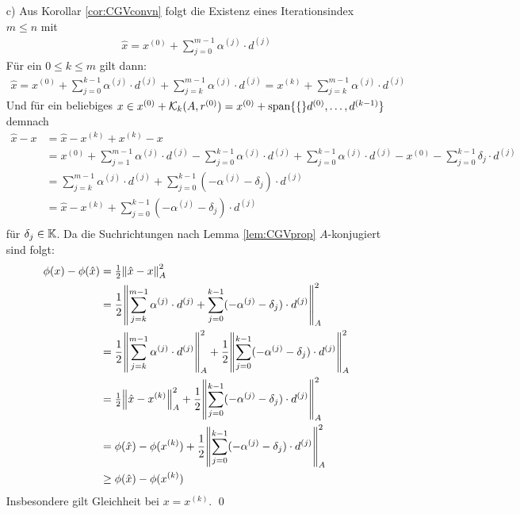 \begin{enumerate}
  \item[c)] 
  Aus Korollar \ref{cor:CGVconvn} folgt die Existenz eines Iterationsindex $m\leq n$ mit 
  \begin{align*}
    \hat{x} 
    = x^{(0)} + \sum_{j=0}^{m-1} \alpha^{(j)}\cdot d^{(j)}
  \end{align*}
  Für ein $0\leq k\leq m$ gilt dann:
  \begin{align*}
    \hat{x}
    = x^{(0)} + \sum_{j=0}^{k-1} \alpha^{(j)}\cdot d^{(j)} + \sum_{j=k}^{m-1} \alpha^{(j)}\cdot d^{(j)} 
    = x^{(k)} + \sum_{j=k}^{m-1} \alpha^{(j)}\cdot d^{(j)}
  \end{align*}
  Und für ein beliebiges $x\in x^{(0)} + \mathcal{K}_k(A,r^{(0)}) = x^{(0)} + \text{span}\{\{\}d^{(0)},\dots,d^{(k-1)}\}$ 
  demnach
  \begin{align*}
    \hat{x}-x 
    & = \hat{x}-x^{(k)}+x^{(k)}-x \\
    & = x^{(0)} + \sum_{j=1}^{m-1}\alpha^{(j)}\cdot d^{(j)} 
    - \sum_{j=0}^{k-1} \alpha^{(j)}\cdot d^{(j)} 
    + \sum_{j=0}^{k-1} \alpha^{(j)}\cdot d^{(j)} 
    - x^{(0)} - \sum_{j=0}^{k-1}\delta_j\cdot d^{(j)}\\
    & = \sum_{j=k}^{m-1}\alpha^{(j)}\cdot d^{(j)} + \sum_{j=0}^{k-1}(-\alpha^{(j)}-\delta_j)\cdot d^{(j)} \\
    & = \hat{x} - x^{(k)} + \sum_{j=0}^{k-1}(-\alpha^{(j)}-\delta_j)\cdot d^{(j)} \\
  \end{align*}
  für $\delta_j\in\mathbb K$. Da die Suchrichtungen nach Lemma \ref{lem:CGVprop} $A$-konjugiert sind folgt:
  \begin{align*}
    \phi(x) - \phi(\hat{x})
    &= \tfrac{1}{2}\vertn{2}{\hat{x}-x}_A^2 \\
    &= \dfrac{1}{2}\vertn{2}{\sum_{j=k}^{m-1}\alpha^{(j)}\cdot d^{(j)} 
    + \sum_{j=0}^{k-1}(-\alpha^{(j)}-\delta_j)\cdot d^{(j)}}_A^2 \\
    &= \dfrac{1}{2}\vertn{2}{\sum_{j=k}^{m-1}\alpha^{(j)}\cdot d^{(j)}}_A^2 
    + \dfrac{1}{2}\vertn{2}{\sum_{j=0}^{k-1}(-\alpha^{(j)}-\delta_j)\cdot d^{(j)}}_A^2 \\
    &= \tfrac{1}{2}\vertn{2}{\hat{x}-x^{(k)}}_A^2 
    + \dfrac{1}{2}\vertn{2}{\sum_{j=0}^{k-1}(-\alpha^{(j)}-\delta_j)\cdot d^{(j)}}_A^2 \\
    &= \phi(\hat{x}) - \phi(x^{(k)}) + \dfrac{1}{2}\vertn{2}{\sum_{j=0}^{k-1}(-\alpha^{(j)}-\delta_j)\cdot d^{(j)}}_A^2 \\
    &\geq \phi(\hat{x}) - \phi(x^{(k)})
  \end{align*}
  Insbesondere gilt Gleichheit bei $x=x^{(k)}$.
  \qed
\end{enumerate}

